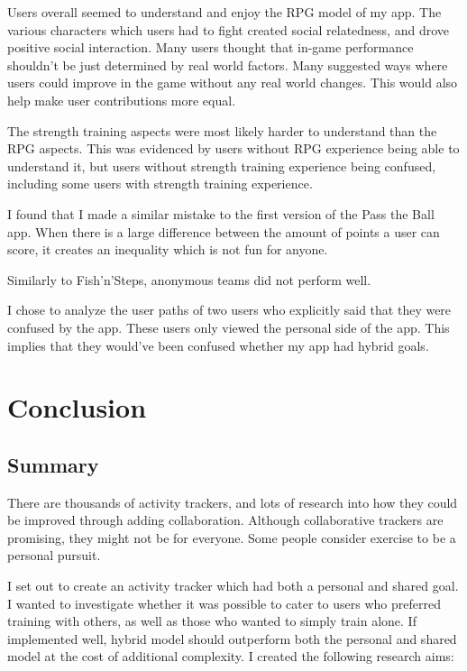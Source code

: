 \documentclass{l4proj}
\begin{document}
Users overall seemed to understand and enjoy the RPG model of my app. The various characters which users had to fight created social relatedness, and drove positive social interaction. Many users thought that in-game performance shouldn't be just determined by real world factors. Many suggested ways where users could improve in the game without any real world changes. This would also help make user contributions more equal. 

The strength training aspects were most likely harder to understand than the RPG aspects. This was evidenced by users without RPG experience being able to understand it, but users without strength training experience being confused, including some users with strength training experience.

I found that I made a similar mistake to the first version of the Pass the Ball app. When there is a large difference between the amount of points a user can score, it creates an inequality which is not fun for anyone.

Similarly to Fish'n'Steps, anonymous teams did not perform well.

I chose to analyze the user paths of two users who explicitly said that they were confused by the app. These users only viewed the personal side of the app. This implies that they would've been confused whether my app had hybrid goals.



\chapter{Conclusion}    
\section{Summary}
There are thousands of activity trackers, and lots of research into how they could be improved through adding collaboration. Although collaborative trackers are promising, they might not be for everyone. Some people consider exercise to be a personal pursuit.

I set out to create an activity tracker which had both a personal and shared goal. I wanted to investigate whether it was possible to cater to users who preferred training with others, as well as those who wanted to simply train alone. If implemented well, hybrid model should outperform both the personal and shared model at the cost of additional complexity. I created the following research aims:
\end{document}
